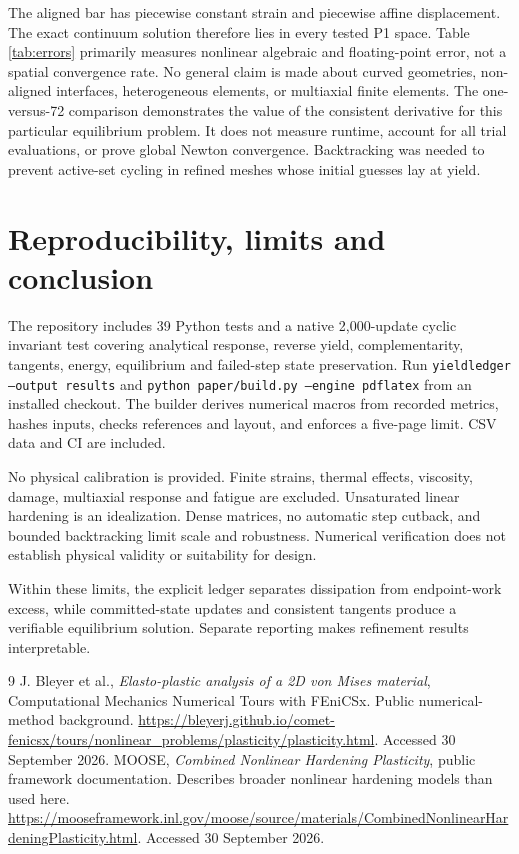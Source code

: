 \documentclass[11pt,a4paper]{article}
\begin{document}
The aligned bar has piecewise constant strain and piecewise affine displacement.
The exact continuum solution therefore lies in every tested P1 space. Table
\ref{tab:errors} primarily measures nonlinear algebraic and floating-point error,
not a spatial convergence rate. No general claim is made about curved geometries,
non-aligned interfaces, heterogeneous elements, or multiaxial finite elements.
The one-versus-72 comparison demonstrates the value of the consistent derivative
for this particular equilibrium problem. It does not measure runtime, account for
all trial evaluations, or prove global Newton convergence. Backtracking was needed
to prevent active-set cycling in refined meshes whose initial guesses lay at yield.

\section{Reproducibility, limits and conclusion}
The repository includes 39 Python tests and a native 2,000-update cyclic invariant
test covering analytical response, reverse yield, complementarity, tangents, energy,
equilibrium and failed-step state preservation. Run \texttt{yieldledger --output results}
and \texttt{python paper/build.py --engine pdflatex} from an installed checkout.
The builder derives numerical macros from recorded metrics, hashes inputs, checks
references and layout, and enforces a five-page limit. CSV data and CI are included.

No physical calibration is provided. Finite strains, thermal effects, viscosity,
damage, multiaxial response and fatigue are excluded. Unsaturated linear hardening
is an idealization. Dense matrices, no automatic step cutback, and bounded
backtracking limit scale and robustness. Numerical verification does not establish
physical validity or suitability for design.

Within these limits, the explicit ledger separates dissipation from endpoint-work
excess, while committed-state updates and consistent tangents produce a verifiable
equilibrium solution. Separate reporting makes refinement results interpretable.

\begin{thebibliography}{9}\small
{} J. Bleyer et al., \emph{Elasto-plastic analysis of a 2D von Mises material},
Computational Mechanics Numerical Tours with FEniCSx. Public numerical-method background.
\url{https://bleyerj.github.io/comet-fenicsx/tours/nonlinear_problems/plasticity/plasticity.html}.
Accessed 30 September 2026.
 MOOSE, \emph{Combined Nonlinear Hardening Plasticity}, public framework
documentation. Describes broader nonlinear hardening models than used here.
\url{https://mooseframework.inl.gov/moose/source/materials/CombinedNonlinearHardeningPlasticity.html}.
Accessed 30 September 2026.
\end{thebibliography}
\end{document}
